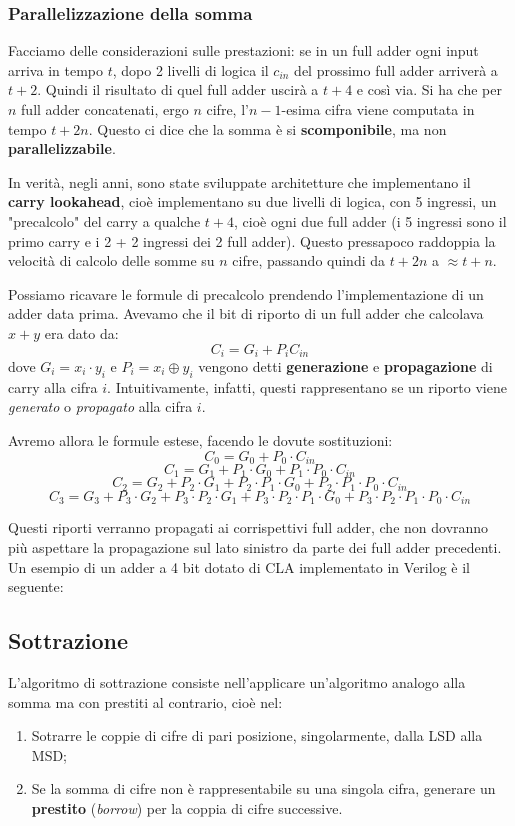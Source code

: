 \documentclass[a4paper,11pt]{article}
\begin{document}
\subsubsection{Parallelizzazione della somma}
Facciamo delle considerazioni sulle prestazioni: se in un full adder ogni input arriva in tempo $t$, dopo 2 livelli di logica il $c_{in}$ del prossimo full adder arriverà a $t + 2$.
Quindi il risultato di quel full adder uscirà a $t + 4$ e così via.
Si ha che per $n$ full adder concatenati, ergo $n$ cifre, l'$n-1$-esima cifra viene computata in tempo $t + 2n$.
Questo ci dice che la somma è si \textbf{scomponibile}, ma non \textbf{parallelizzabile}.

In verità, negli anni, sono state sviluppate architetture che implementano il \textbf{carry lookahead}, cioè implementano su due livelli di logica, con 5 ingressi, un "precalcolo" del carry a qualche $t + 4$, cioè ogni due full adder (i 5 ingressi sono il primo carry e i 2 + 2 ingressi dei 2 full adder).
Questo pressapoco raddoppia la velocità di calcolo delle somme su $n$ cifre, passando quindi da $t + 2n$ a $\approx t + n$.

Possiamo ricavare le formule di precalcolo prendendo l'implementazione di un adder data prima.
Avevamo che il bit di riporto di un full adder che calcolava $x + y$ era dato da:
$$
C_i = G_i + P_i C_{in}
$$
dove $G_i = x_i \cdot y_i$ e $P_i = x_i \oplus y_i$ vengono detti \textbf{generazione} e \textbf{propagazione} di carry alla cifra $i$. Intuitivamente, infatti, questi rappresentano se un riporto viene \textit{generato} o \textit{propagato} alla cifra $i$.

Avremo allora le formule estese, facendo le dovute sostituzioni:
$$
C_0 = G_0 + P_0 \cdot C_{in}
$$
$$
C_1 = G_1 + P_1 \cdot G_0 + P_1 \cdot P_0 \cdot C_{in}
$$
$$
C_2 = G_2 + P_2 \cdot G_1 + P_2 \cdot P_1 \cdot G_0 + P_2 \cdot P_1 \cdot P_0 \cdot C_{in}
$$
$$
C_3 = G_3 + P_3 \cdot G_2 + P_3 \cdot P_2 \cdot G_1 + P_3 \cdot P_2 \cdot P_1 \cdot G_0 + P_3 \cdot P_2 \cdot P_1 \cdot P_0 \cdot C_{in}
$$

Questi riporti verranno propagati ai corrispettivi full adder, che non dovranno più aspettare la propagazione sul lato sinistro da parte dei full adder precedenti.
Un esempio di un adder a 4 bit dotato di CLA implementato in Verilog è il seguente:



\subsection{Sottrazione}
L'algoritmo di sottrazione consiste nell'applicare un'algoritmo analogo alla somma ma con prestiti al contrario, cioè nel:
\begin{enumerate}
	\item Sotrarre le coppie di cifre di pari posizione, singolarmente, dalla LSD alla MSD;
	\item Se la somma di cifre non è rappresentabile su una singola cifra, generare un \textbf{prestito} (\textit{borrow}) per la coppia di cifre successive.
\end{enumerate}
\end{document}
